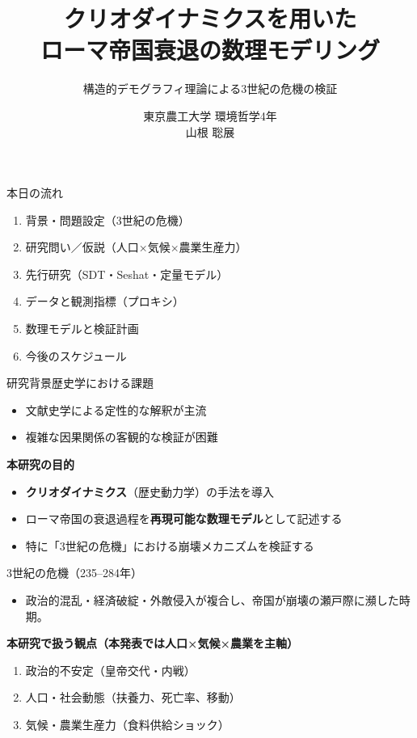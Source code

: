 \documentclass[aspectratio=169,11pt]{beamer}
\title{クリオダイナミクスを用いた\\ローマ帝国衰退の数理モデリング}
\subtitle{構造的デモグラフィ理論による3世紀の危機の検証}
\author{東京農工大学 環境哲学4年\\山根 聡展}
\date{}
\begin{document}
\begin{frame}
  \titlepage
\end{frame}

\begin{frame}{本日の流れ}
  \begin{enumerate}
    \item 背景・問題設定（3世紀の危機）
    \item 研究問い／仮説（人口×気候×農業生産力）
    \item 先行研究（SDT・Seshat・定量モデル）
    \item データと観測指標（プロキシ）
    \item 数理モデルと検証計画
    \item 今後のスケジュール
  \end{enumerate}
\end{frame}

\begin{frame}{研究背景}{歴史学における課題}
  \begin{itemize}
    \item 文献史学による定性的な解釈が主流
    \item 複雑な因果関係の客観的な検証が困難
  \end{itemize}

  \vspace{0.8em}
  \textbf{本研究の目的}
  \begin{itemize}
    \item \textbf{クリオダイナミクス}（歴史動力学）の手法を導入
    \item ローマ帝国の衰退過程を\textbf{再現可能な数理モデル}として記述する
    \item 特に「3世紀の危機」における崩壊メカニズムを検証する
  \end{itemize}
\end{frame}

\begin{frame}{3世紀の危機（235--284年）}
  \begin{itemize}
    \item 政治的混乱・経済破綻・外敵侵入が複合し、帝国が崩壊の瀬戸際に瀕した時期。
  \end{itemize}

  \vspace{0.6em}
  \textbf{本研究で扱う観点（本発表では人口×気候×農業を主軸）}
  \begin{enumerate}
    \item 政治的不安定（皇帝交代・内戦）
    \item 人口・社会動態（扶養力、死亡率、移動）
    \item 気候・農業生産力（食料供給ショック）
  \end{enumerate}
\end{frame}
\end{document}

